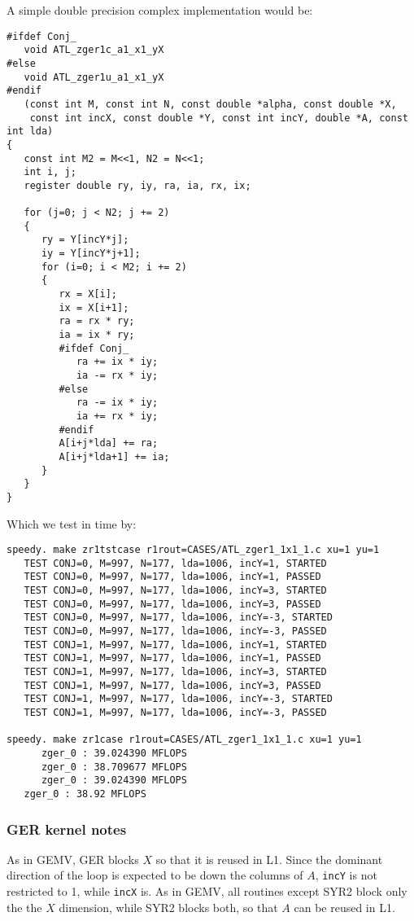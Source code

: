 \documentclass[11pt]{article}
\begin{document}
{A simple double precision complex implementation would be:
\begin{verbatim}
#ifdef Conj_
   void ATL_zger1c_a1_x1_yX
#else
   void ATL_zger1u_a1_x1_yX
#endif
   (const int M, const int N, const double *alpha, const double *X, 
    const int incX, const double *Y, const int incY, double *A, const int lda)
{
   const int M2 = M<<1, N2 = N<<1;
   int i, j;
   register double ry, iy, ra, ia, rx, ix;

   for (j=0; j < N2; j += 2)
   {
      ry = Y[incY*j];
      iy = Y[incY*j+1];
      for (i=0; i < M2; i += 2)
      {
         rx = X[i];
         ix = X[i+1];
         ra = rx * ry;
         ia = ix * ry;
         #ifdef Conj_
            ra += ix * iy;
            ia -= rx * iy;
         #else
            ra -= ix * iy;
            ia += rx * iy;
         #endif
         A[i+j*lda] += ra;
         A[i+j*lda+1] += ia;
      }
   }
}
\end{verbatim}

Which we test in time by:
\begin{verbatim}
speedy. make zr1tstcase r1rout=CASES/ATL_zger1_1x1_1.c xu=1 yu=1
   TEST CONJ=0, M=997, N=177, lda=1006, incY=1, STARTED
   TEST CONJ=0, M=997, N=177, lda=1006, incY=1, PASSED
   TEST CONJ=0, M=997, N=177, lda=1006, incY=3, STARTED
   TEST CONJ=0, M=997, N=177, lda=1006, incY=3, PASSED
   TEST CONJ=0, M=997, N=177, lda=1006, incY=-3, STARTED
   TEST CONJ=0, M=997, N=177, lda=1006, incY=-3, PASSED
   TEST CONJ=1, M=997, N=177, lda=1006, incY=1, STARTED
   TEST CONJ=1, M=997, N=177, lda=1006, incY=1, PASSED
   TEST CONJ=1, M=997, N=177, lda=1006, incY=3, STARTED
   TEST CONJ=1, M=997, N=177, lda=1006, incY=3, PASSED
   TEST CONJ=1, M=997, N=177, lda=1006, incY=-3, STARTED
   TEST CONJ=1, M=997, N=177, lda=1006, incY=-3, PASSED

speedy. make zr1case r1rout=CASES/ATL_zger1_1x1_1.c xu=1 yu=1
      zger_0 : 39.024390 MFLOPS
      zger_0 : 38.709677 MFLOPS
      zger_0 : 39.024390 MFLOPS
   zger_0 : 38.92 MFLOPS
\end{verbatim}

\subsubsection{GER kernel notes}

As in GEMV, GER blocks $X$ so that it is reused in L1.  Since the
dominant direction of the loop is expected to be down the columns of
$A$, {\tt incY} is not restricted to 1, while {\tt incX} is.  As in GEMV,
all routines except SYR2 block only the the $X$ dimension, while
SYR2 blocks both, so that $A$ can be reused in L1.
}
\end{document}
